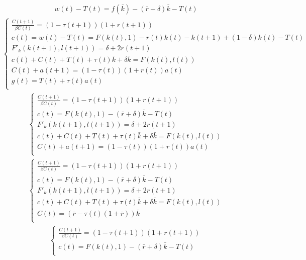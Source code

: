 \documentclass[a4paper]{article}
\begin{document}
\begin{enumerate}
\begin{enumerate}[(a)]
\begin{align*}
w(t) - T(t) = f(\bar{k}) - (\bar{r} + \delta)\bar{k} - T(t)
\end{align*}
\begin{align*}
\begin{cases}
\frac{C(t+1)}{\beta C(t)} = (1 - \tau(t+1))(1 + r(t+1))\\
c(t) = w(t) - T(t) = F(k(t), 1) - r(t)k(t) - k(t+1) + (1 - \delta)k(t) - T(t)\\
F'_k(k(t+1), l(t+1)) = \delta +2r(t+1)\\
c(t) + C(t) + T(t) + \tau(t) \bar{k} + \delta\bar{k} = F(k(t), l(t))\\
C(t) + a(t+1) = (1 - \tau(t))(1 + r(t))a(t)\\
g(t) = T(t) + \tau(t) a(t)\\
\end{cases}
\end{align*}
\begin{align*}
\begin{cases}
\frac{C(t+1)}{\beta C(t)} = (1 - \tau(t+1))(1 + r(t+1))\\
c(t) = F(k(t), 1) - (\bar{r} +\delta)\bar{k} - T(t)\\
F'_k(k(t+1), l(t+1)) = \delta +2r(t+1)\\
c(t) + C(t) + T(t) + \tau(t) \bar{k} + \delta\bar{k} = F(k(t), l(t))\\
C(t) + a(t+1) = (1 - \tau(t))(1 + r(t))a(t)\\
\end{cases}
\end{align*}
\begin{align*}
\begin{cases}
\frac{C(t+1)}{\beta C(t)} = (1 - \tau(t+1))(1 + r(t+1))\\
c(t) = F(k(t), 1) - (\bar{r} +\delta)\bar{k} - T(t)\\
F'_k(k(t+1), l(t+1)) = \delta +2r(t+1)\\
c(t) + C(t) + T(t) + \tau(t) \bar{k} + \delta\bar{k} = F(k(t), l(t))\\
C(t) = (\bar{r} - \tau(t)(1 + \bar{r}))\bar{k}\\
\end{cases}
\end{align*}
\begin{align*}
\begin{cases}
\frac{C(t+1)}{\beta C(t)} = (1 - \tau(t+1))(1 + r(t+1))\\
c(t) = F(k(t), 1) - (\bar{r} +\delta)\bar{k} - T(t)\\

\end{cases}
\end{align*}
\end{enumerate}
\end{enumerate}
\end{document}

